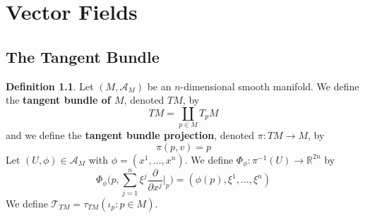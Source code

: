 \documentclass{book}
\theoremstyle{definition}
\newtheorem{defn}[definition]{Definition}
\newcommand{\R}{\mathbb{R}}
\newcommand{\MA}{\mathcal{A}}
\newcommand{\MT}{\mathcal{T}}
\DeclareMathOperator*{\0}{\mbf{0}}
\DeclareMathOperator*{\1}{\mbf{1}}
\newcommand{\tbf}[1]{\textbf{#1}}
\newcommand{\p}{\partial}
\begin{document}
	
	
	
	
	
	
	
	



























\newpage
\chapter{Vector Fields}
	
\section{The Tangent Bundle}
	
\begin{defn}
	Let $(M, \MA_M)$ be an $n$-dimensional smooth manifold. We define the \tbf{tangent bundle of $M$}, denoted $TM$, by  
	$$TM = \coprod_{p \in M} T_p M $$ 
	and we define the \tbf{tangent bundle projection}, denoted $\pi: TM \rightarrow M$, by 
	$$\pi(p, v) = p$$
	Let $(U, \phi) \in \MA_M$ with $\phi = (x^1, \ldots, x^n)$. We define $\Phi_{\phi}: \pi^{-1}(U) \rightarrow \R^{2n}$ by 
	$$\Phi_{\phi} \bigg(p, \sum_{j=1}^n \xi^j \frac{\p}{\p x^j} \bigg|_p \bigg) = (\phi(p), \xi^1, \ldots, \xi^n)$$ 
	We define $\MT_{TM} = \tau_{TM}(\iota_p : p \in M)$.
\end{defn}
	
\end{document}
